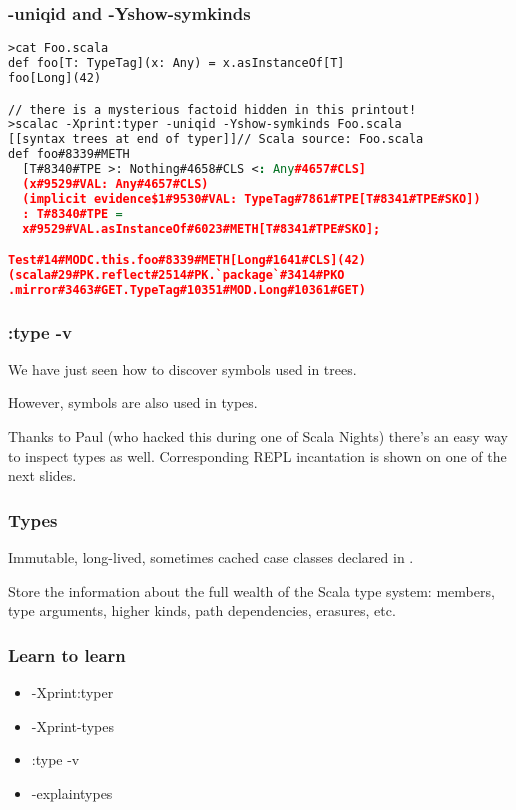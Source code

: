\documentclass[hyperref={bookmarks=false}]{beamer}
\begin{document}
\begin{frame}[fragile]
\frametitle{-uniqid and -Yshow-symkinds}

\begin{lstlisting}[language=XML]
>cat Foo.scala
def foo[T: TypeTag](x: Any) = x.asInstanceOf[T]
foo[Long](42)

// there is a mysterious factoid hidden in this printout!
>scalac -Xprint:typer -uniqid -Yshow-symkinds Foo.scala
[[syntax trees at end of typer]]// Scala source: Foo.scala
def foo#8339#METH
  [T#8340#TPE >: Nothing#4658#CLS <: Any#4657#CLS]
  (x#9529#VAL: Any#4657#CLS)
  (implicit evidence$1#9530#VAL: TypeTag#7861#TPE[T#8341#TPE#SKO])
  : T#8340#TPE =
  x#9529#VAL.asInstanceOf#6023#METH[T#8341#TPE#SKO];

Test#14#MODC.this.foo#8339#METH[Long#1641#CLS](42)
(scala#29#PK.reflect#2514#PK.`package`#3414#PKO
.mirror#3463#GET.TypeTag#10351#MOD.Long#10361#GET)
\end{lstlisting}

\end{frame}

\begin{frame}[fragile]
\frametitle{:type -v}

We have just seen how to discover symbols used in trees.

However, symbols are also used in types.

Thanks to Paul (who hacked this during one of Scala Nights)
there's an easy way to inspect types as well.
Corresponding REPL incantation is shown on one of the next slides.

\end{frame}

\begin{frame}[fragile]
\frametitle{Types}

Immutable, long-lived, sometimes cached case classes declared in .

Store the information about the full wealth of the Scala type system:
members, type arguments, higher kinds, path dependencies, erasures, etc.

\end{frame}

\begin{frame}[fragile]
\frametitle{Learn to learn}

\begin{itemize}
\item -Xprint:typer
\item -Xprint-types
\item :type -v
\item -explaintypes
\end{itemize}

\end{frame}
\end{document}
